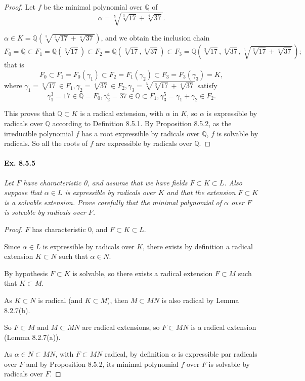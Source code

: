 \documentclass[11pt,a4paper]{article}
\newcommand{\Q}{\mathbb{Q}}
\begin{document}
\begin{proof}
Let $f$ be the minimal polynomial over $\Q$ of 
$$\alpha = \sqrt[5]{\sqrt[3]{17} + \sqrt[4]{37}}.$$

$\alpha \in K = \Q( \sqrt[5]{\sqrt[3]{17} + \sqrt[4]{37}})$, and we obtain the inclusion chain
$$F_0 = \Q \subset F_1 = \Q(\sqrt[3]{17} ) \subset F_2 = \Q(\sqrt[3]{17}, \sqrt[4]{37}) \subset F_3 = \Q\left(\sqrt[3]{17}, \sqrt[4]{37}, \sqrt[5]{\sqrt[3]{17} + \sqrt[4]{37}}\right);$$
that is
$$F_0 \subset F_1=F_0(\gamma_1) \subset F_2 = F_1(\gamma_2) \subset F_3 = F_3(\gamma_3)=K,$$
where $\gamma_1 = \sqrt[3]{17} \in F_1,\gamma_2 = \sqrt[4]{37} \in F_2, \gamma_3 = \sqrt[5]{\sqrt[3]{17} + \sqrt[4]{37}}$ satisfy $$\gamma_1^3 = 17 \in \Q=F_0, \gamma_2^4 = 37 \in \Q \subset F_1, \gamma_3^5 = \gamma_1+\gamma_2 \in F_2.$$

This proves that $\Q \subset K$ is a radical extension, with $\alpha$ in $K$, so $\alpha$ is expressible by radicals over $\Q$ according to Definition 8.5.1. By Proposition 8.5.2, as the irreducible polynomial $f$ has a root expressible by radicals over $\Q$, $f$ is solvable by radicals. So all the roots of $f$ are expressible by radicals over $\Q$.
\end{proof}

\paragraph{Ex. 8.5.5}

{\it Let $F$ have characteristic 0, and assume that we have fields $F \subset K \subset L$. Also suppose that $\alpha \in L$ is expressible by radicals over $K$ and that the extension $F \subset K$ is a solvable extension. Prove carefully that the minimal polynomial of $\alpha$ over $F$ is solvable by radicals over $F$.
}

\begin{proof}
$F$ has characteristic 0, and $F \subset K \subset L$.

 Since $\alpha \in L$ is expressible by radicals over $K$,  there exists by definition a radical extension $K \subset N$ such that $\alpha\in N$. 
 
By hypothesis $F\subset K$ is solvable, so there exists a radical extension $F\subset M$ such that $K \subset M$.

As $K \subset N$ is radical (and $K \subset M$), then  $M \subset MN$ is also radical by Lemma 8.2.7(b).

So $F \subset M$ and $M \subset MN$ are radical extensions, so $F \subset MN$ is a radical extension (Lemma 8.2.7(a)).

As $\alpha \in N \subset MN$, with $F \subset MN$ radical, by definition $\alpha$ is expressible par radicals over $F$ and by Proposition 8.5.2, its minimal polynomial $f$ over $F$ is solvable by radicals over $F$.
\end{proof}
\end{document}
